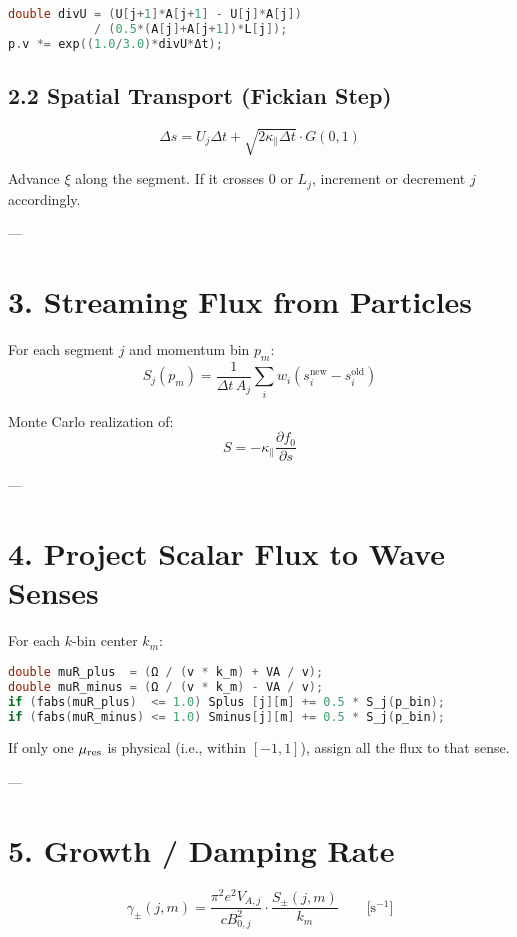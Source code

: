 \begin{lstlisting}[language=C++,basicstyle=\ttfamily\small]
double divU = (U[j+1]*A[j+1] - U[j]*A[j]) 
            / (0.5*(A[j]+A[j+1])*L[j]);
p.v *= exp((1.0/3.0)*divU*Δt);
\end{lstlisting}

\subsection*{2.2 Spatial Transport (Fickian Step)}
\[
\Delta s = U_j \Delta t + \sqrt{2 \kappa_\parallel \Delta t} \cdot G(0,1)
\]

Advance $\xi$ along the segment. If it crosses $0$ or $L_j$, increment or decrement $j$ accordingly.

---

\section*{3. Streaming Flux from Particles}

For each segment $j$ and momentum bin $p_m$:
\[
S_j(p_m) = \frac{1}{\Delta t\,A_j} \sum_i w_i (s_i^{\text{new}} - s_i^{\text{old}})
\]

Monte Carlo realization of:
\[
S = -\kappa_\parallel \frac{\partial f_0}{\partial s}
\]

---

\section*{4. Project Scalar Flux to Wave Senses}

For each $k$-bin center $k_m$:

\begin{lstlisting}[language=C++,basicstyle=\ttfamily\small]
double muR_plus  = (Ω / (v * k_m) + VA / v);
double muR_minus = (Ω / (v * k_m) - VA / v);
if (fabs(muR_plus)  <= 1.0) Splus [j][m] += 0.5 * S_j(p_bin);
if (fabs(muR_minus) <= 1.0) Sminus[j][m] += 0.5 * S_j(p_bin);
\end{lstlisting}

If only one $\mu_{\rm res}$ is physical (i.e., within $[-1,1]$), assign all the flux to that sense.

---

\section*{5. Growth / Damping Rate}

\begin{equation}
\boxed{
\gamma_\pm(j,m) = \frac{\pi^2 e^2 V_{A,j}}{c B_{0,j}^2} \cdot \frac{S_\pm(j,m)}{k_m}
}
\qquad \text{[s$^{-1}$]}
\end{equation}

